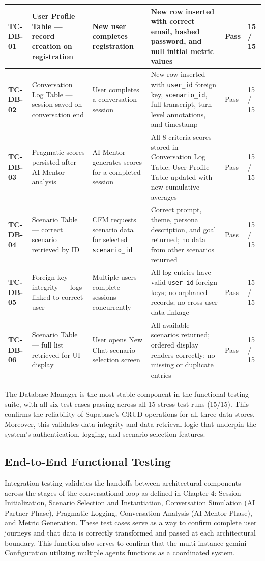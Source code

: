 \begin{longtable}{>{\bfseries}p{1.2cm} p{3.0cm} p{3.5cm} p{4.5cm} p{1.0cm} p{1.5cm}}
\midrule
TC-DB-01 & User Profile Table --- record creation on registration & New user completes registration & New row inserted with correct email, hashed password, and null initial metric values & Pass & 15 / 15 \\
\midrule
TC-DB-02 & Conversation Log Table --- session saved on conversation end & User completes a conversation session & New row inserted with \texttt{user\_id} foreign key, \texttt{scenario\_id}, full transcript, turn-level annotations, and timestamp & Pass & 15 / 15 \\
\midrule
TC-DB-03 & Pragmatic scores persisted after AI Mentor analysis & AI Mentor generates scores for a completed session & All 8 criteria scores stored in Conversation Log Table; User Profile Table updated with new cumulative averages & Pass & 15 / 15 \\
\midrule
TC-DB-04 & Scenario Table --- correct scenario retrieved by ID & CFM requests scenario data for selected \texttt{scenario\_id} & Correct prompt, theme, persona description, and goal returned; no data from other scenarios returned & Pass & 15 / 15 \\
\midrule
TC-DB-05 & Foreign key integrity --- logs linked to correct user & Multiple users complete sessions concurrently & All log entries have valid \texttt{user\_id} foreign keys; no orphaned records; no cross-user data linkage & Pass & 15 / 15 \\
\midrule
TC-DB-06 & Scenario Table --- full list retrieved for UI display & User opens New Chat scenario selection screen & All available scenarios returned; ordered display renders correctly; no missing or duplicate entries & Pass & 15 / 15 \\
\bottomrule
\end{longtable}
 
\noindent The Database Manager is the most stable component in the functional testing suite, with all six test cases passing across all 15 stress test runs (15/15). This confirms the reliability of Supabase's CRUD operations for all three data stores. Moreover, this validates data integrity and 
data retrieval logic that underpin the system's authentication, logging, and scenario selection features.
 
\subsection{End-to-End Functional Testing}
 
Integration testing validates the handoffs between architectural components across the stages of the conversational loop as defined in Chapter 4: Session Initialization, Scenario Selection and Instantiation, Conversation Simulation (AI Partner Phase), 
Pragmatic Logging, Conversation Analysis (AI Mentor Phase), and Metric Generation. These test cases serve as a way to confirm complete user journeys and that data is correctly transformed and passed at each architectural boundary. This function also 
serves to confirm that the multi-instance gemini Configuration utilizing multiple agents functions as a coordinated system. 
 
